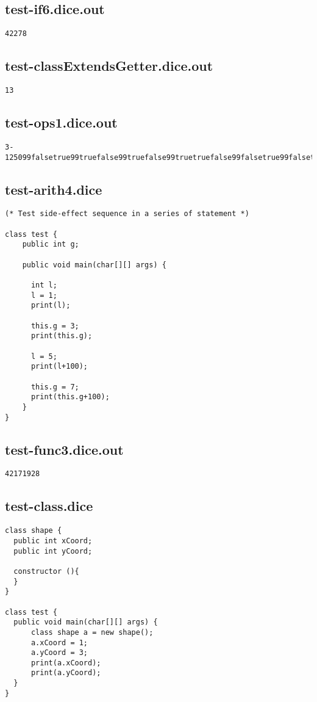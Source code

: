 \subsection{test-if6.dice.out}
\begin{verbatim}
42278
\end{verbatim}
\pagebreak
\subsection{test-classExtendsGetter.dice.out}
\begin{verbatim}
13
\end{verbatim}
\pagebreak
\subsection{test-ops1.dice.out}
\begin{verbatim}
3-125099falsetrue99truefalse99truefalse99truetruefalse99falsetrue99falsetruetrue
\end{verbatim}
\pagebreak
\subsection{test-arith4.dice}
\begin{verbatim}
(* Test side-effect sequence in a series of statement *)

class test {
	public int g;

	public void main(char[][] args) {

	  int l;
	  l = 1;
	  print(l);
	  
	  this.g = 3;
	  print(this.g);
	  
	  l = 5;
	  print(l+100);
	  
	  this.g = 7;
	  print(this.g+100);
	}
}
\end{verbatim}
\pagebreak
\subsection{test-func3.dice.out}
\begin{verbatim}
42171928
\end{verbatim}
\pagebreak
\subsection{test-class.dice}
\begin{verbatim}
class shape {
  public int xCoord;
  public int yCoord;

  constructor (){
  }
}

class test {
  public void main(char[][] args) {
      class shape a = new shape(); 
      a.xCoord = 1;
      a.yCoord = 3;
      print(a.xCoord);
      print(a.yCoord);
  }
}
\end{verbatim}
\pagebreak
